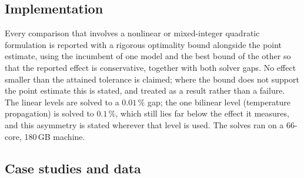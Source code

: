 \documentclass[a4paper,fleqn]{cas-sc}
\newcommand{\new}[1]{\textcolor[HTML]{1A5FB4}{#1}}   %
\newcommand{\new}[1]{#1}
\begin{document}
\subsection{Implementation}
\new{}
Every comparison that involves a nonlinear or mixed-integer quadratic formulation is reported
with a rigorous optimality bound alongside the point estimate, using the incumbent of one model
and the best bound of the other so that the reported effect is conservative, together with both
solver gaps. No effect smaller than the attained tolerance is claimed; where
the bound does not support the point estimate this is stated, and treated as a result rather than
a failure. The linear levels are solved to a $0.01$\,\% gap; the one bilinear level
(temperature propagation) is solved to $0.1$\,\%, which still lies far below the effect it
measures, and this asymmetry is stated wherever that level is used. The solves ran on a
66-core, 180\,GB machine.

\subsection{Case studies and data}
\label{sec:cases}
\end{document}
